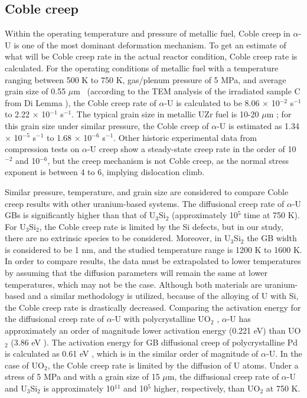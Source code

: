 \documentclass[review]{elsarticle}
\begin{document}
\subsection{Coble creep}

Within the operating temperature and pressure of metallic fuel, Coble creep in $\alpha$-U is one of the most dominant deformation mechanism. To get an estimate of what will be Coble creep rate in the actual reactor condition, Coble creep rate is calculated. For the operating conditions of metallic fuel \cite{recent_review} with a temperature ranging between 500 K to 750 K, gas/plenum pressure of 5 MPa, and average grain size of 0.55 $\mu$m \ (according to the TEM analysis of the irradiated sample C from Di Lemma \cite{DILEMMA2020152467}), the Coble creep rate of $\alpha$-U is calculated to be 8.06 $\times$ 10$^{-2}$ s$^{-1}$ to 2.22 $\times$ 10$^{-1}$ s$^{-1}$. The typical grain size in metallic UZr fuel is 10-20 $\mu$m \cite{osti_1469797}; for this grain size under similar pressure, the Coble creep of $\alpha$-U is estimated as 1.34 $\times$ 10$^{-5}$ s$^{-1}$ to 1.68 $\times$ 10$^{-6}$ s$^{-1}$. Other historic experimental data \cite{ROBINSON1973293} from compression tests on $\alpha$-U creep show a steady-state creep rate in the order of 10$^{-2}$ and 10$^{-6}$, but the creep mechanism is not Coble creep, as the normal stress exponent is between 4 to 6, implying dislocation climb. 

Similar pressure, temperature, and grain size are considered to compare Coble creep results with other uranium-based systems. The diffusional creep rate of $\alpha$-U GBs is significantly higher than that of U$_\mathrm{3}$Si$_\mathrm{2}$ (approximately 10$^{5}$ time at 750 K). For U$_\mathrm{3}$Si$_\mathrm{2}$, the Coble creep rate is limited by the Si defects, but in our study, there are no extrinsic species to be considered. Moreover, in U$_\mathrm{3}$Si$_\mathrm{2}$ \cite{COOPER2021153129} the GB width is considered to be 1 nm, and the studied temperature range is 1200 K to 1600 K. In order to compare results, the data must be extrapolated to lower temperatures by assuming that the diffusion parameters will remain the same at lower temperatures, which may not be the case. Although both materials are uranium-based and a similar methodology is utilized, because of the alloying of U with Si, the Coble creep rate is drastically decreased. Comparing the activation energy for the diffusional creep rate of $\alpha$-U with polycrystalline UO$_\mathrm{2}$ \cite{DESAI20084489}, $\alpha$-U has approximately an order of magnitude lower activation energy (0.221 eV) than UO$_\mathrm{2}$ (3.86 eV \cite{DESAI20084489}). The activation energy for GB diffusional creep of polycrystalline Pd is calculated as 0.61 eV \cite{YAMAKOV200261_Pd_creep}, which is in the similar order of magnitude of $\alpha$-U. In the case of UO$_2$, the Coble creep rate is limited by the diffusion of U atoms. Under a stress of 5 MPa and with a grain size of 15 $\mu$m, the diffusional creep rate of $\alpha$-U and U$_\mathrm{3}$Si$_\mathrm{2}$ is approximately 10$^{11}$ and 10$^{5}$ higher, respectively, than UO$_\mathrm{2}$ at 750 K.  
\end{document}
